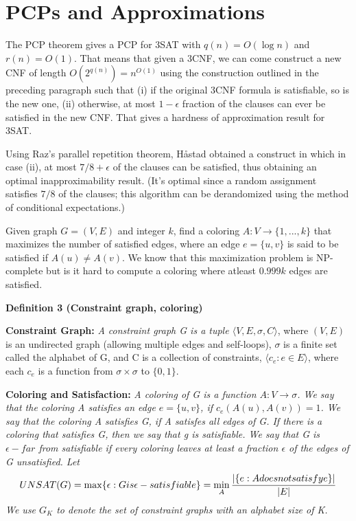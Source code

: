 \section{PCPs and Approximations}
The PCP theorem gives a PCP for 3SAT with $q(n) = O(\log n)$ and $r(n) = O(1)$. That means that given a 3CNF, we can come construct a new CNF of length $O(2^{q(n)}) = n^{O(1)}$ using the construction outlined in the preceding paragraph such that (i) if the original 3CNF formula is satisfiable, so is the new one, (ii) otherwise, at most $1-\epsilon$ fraction of the clauses can ever be satisfied in the new CNF. That gives a hardness of approximation result for 3SAT. 

Using Raz's parallel repetition theorem, Håstad obtained a construct in which in case (ii), at most $7/8+\epsilon$ of the clauses can be satisfied, thus obtaining an optimal inapproximability result. (It's optimal since a random assignment satisfies $7/8$ of the clauses; this algorithm can be derandomized using the method of conditional expectations.)

Given graph $G = (V,E)$ and integer $k$, find a coloring $A : V \rightarrow \{1,...,k\}$ that maximizes the number of satisfied edges, where an edge $e = \{u,v\}$ is said to be satisfied if $A(u) \neq A(v)$. We know that this maximization problem is NP-complete but is it hard to compute a coloring where atleast $0.999k$ edges are satisfied.

\textbf{Definition 3 (Constraint graph, coloring)}

\textbf{Constraint Graph:} \textit{A constraint graph G is a tuple $\langle V, E, \sigma, C \rangle$}, where $(V,E)$ is an undirected graph (allowing multiple edges and self-loops), $\sigma$ is a finite set called the alphabet of G, and C is a collection of constraints, $\langle c_e : e \in E \rangle$, where each $c_e$ is a function from $\sigma \times \sigma$ to $\{0,1\}$.

\textbf{Coloring and Satisfaction:} \textit{A coloring of G is a function $A : V \rightarrow \sigma$. We say that the coloring A satisfies an edge $e = \{u,v\}$, if $c_e(A(u),A(v)) = 1$. We say that the coloring A satisfies G, if A satisfes all edges of G. If there is a coloring that satisfies G, then we say that g is satisfiable. We say that G is $\epsilon-far$ from satisfiable if every coloring leaves at least a fraction $\epsilon$ of the edges of G unsatisfied. Let $$UNSAT(G) = \max \{\epsilon : G is \epsilon -satisfiable\} = \min_A \frac{\arrowvert\{e : A does not satisfy e\}\arrowvert}{\arrowvert E \arrowvert}$$ We use $G_K$ to denote the set of constraint graphs with an alphabet size of K.}
